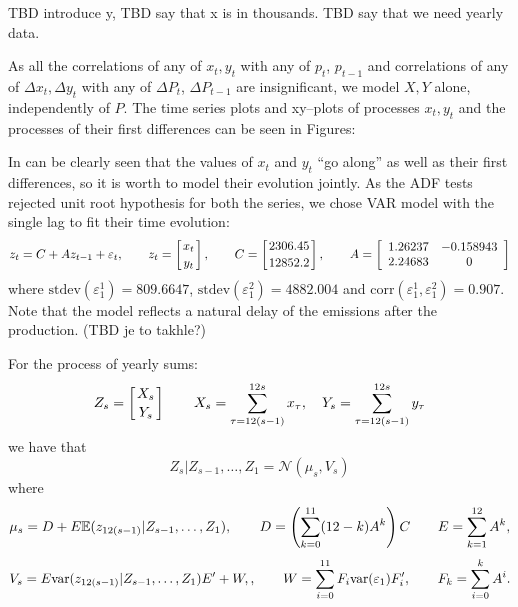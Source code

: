 \documentclass[3p,times]{elsarticle}
\begin{document}
TBD introduce y, TBD say that x is in thousands. TBD say that we need yearly data.

As all the correlations of any of $x_t,y_t$ with any of $p_t$, $p_{t-1}$  and correlations of any of $\Delta x_t,\Delta y_t$ with any of $\Delta P_t$, $\Delta P_{t-1}$ are insignificant, we model $X,Y$ alone, independently of $P$. The time series plots and xy--plots of processes $x_t,y_t$ and the processes of their first differences can be seen in Figures:




In can be clearly seen that the values of $x_t$ and $y_t$ ``go along'' as well as their first differences, so it is worth to model their evolution jointly. As the ADF tests rejected unit root hypothesis for both the series, we chose VAR model with the single lag to fit their time evolution:
\begin{equation}\label{xymodel}
z_t=C + A z_{t-1} + \varepsilon_t,\qquad 
z_t = \left[x_t \atop y_t\right],
\qquad C = \left[2306	.45\atop 12852.2\right],
\qquad 
A=\left[\begin{array}{cc}
1.26237 &  -0.158943\\
2.24683 & 0 
\end{array}\right]
\end{equation}
where $\mathrm{stdev}(\varepsilon^1_1)=809.6647$, $\mathrm{stdev}(\varepsilon^2_1)=4882.004$ and $\mathrm{corr}(\varepsilon^1_1,\varepsilon^2_1)=0.907$.  Note that the model reflects a natural delay of the emissions after the production. (TBD je to takhle?)

For the process of yearly sums:
$$
Z_s = \left[X_s\atop Y_s\right]
\qquad 
X_s = \sum_{\tau = 12(s-1)}^{12s} x_\tau,
\quad
Y_s =\sum_{\tau = 12(s-1)}^{12s} y_\tau
$$
we have that 
$$
Z_s|Z_{s-1},\dots,Z_1 = \mathcal{N}
\left(\mu_s,V_s\right)
$$
where
$$
\mu_s = D + E\mathbb{E}(z_{12(s-1)}|Z_{s-1},\dots,Z_1),
\qquad 
D 
=\left( \sum_{k=0}^{11} (12-k) A^k\right) C
\qquad 
E = \sum_{k=1}^{12} A^{k},
$$
$$
V_s = E\mathrm{var}(z_{12(s-1)}|Z_{s-1},\dots,Z_1)E'+W,,
\qquad
W = \sum_{i=0}^{11}F_{i}\mathrm{var}(\varepsilon_1)F'_{i},
\qquad 
F_k= \sum_{i=0}^k A^i.
$$
\end{document}

